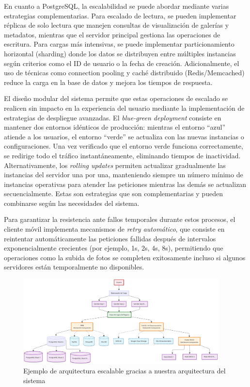 En cuanto a PostgreSQL, la escalabilidad se puede abordar mediante varias estrategias complementarias. Para escalado de lectura, se pueden implementar réplicas de solo lectura que manejen consultas de visualización de galerías y metadatos, mientras que el servidor principal gestiona las operaciones de escritura. Para cargas más intensivas, se puede implementar particionamiento horizontal (sharding) donde los datos se distribuyen entre múltiples instancias según criterios como el ID de usuario o la fecha de creación. Adicionalmente, el uso de técnicas como connection pooling y caché distribuido (Redis/Memcached) reduce la carga en la base de datos y mejora los tiempos de respuesta.



El diseño modular del sistema permite que estas operaciones de escalado se realicen sin impacto en la experiencia del usuario mediante la implementación de estrategias de despliegue avanzadas. El \textit{blue-green deployment} consiste en mantener dos entornos idénticos de producción: mientras el entorno ``azul'' atiende a los usuarios, el entorno ``verde'' se actualiza con las nuevas instancias o configuraciones. Una vez verificado que el entorno verde funciona correctamente, se redirige todo el tráfico instantáneamente, eliminando tiempos de inactividad. Alternativamente, los \textit{rolling updates} permiten actualizar gradualmente las instancias del servidor una por una, manteniendo siempre un número mínimo de instancias operativas para atender las peticiones mientras las demás se actualizan secuencialmente. Estas son estrategias que son complementarias y pueden combinarse según las necesidades del sistema.

Para garantizar la resistencia ante fallos temporales durante estos procesos, el cliente móvil implementa mecanismos de \textit{retry automático}, que consiste en reintentar automáticamente las peticiones fallidas después de intervalos exponencialmente crecientes (por ejemplo, 1s, 2s, 4s, 8s), permitiendo que operaciones como la subida de fotos se completen exitosamente incluso si algunos servidores están temporalmente no disponibles.

\begin{figure}[H]
    \begin{center}
        \includegraphics[width=0.95\textwidth]{assets/arquitectura-escalable.png}
    \end{center}
    \caption{Ejemplo de arquitectura escalable gracias a nuestra arquitectura del sistema}\label{fig:arquitectura-escalable}
\end{figure}

